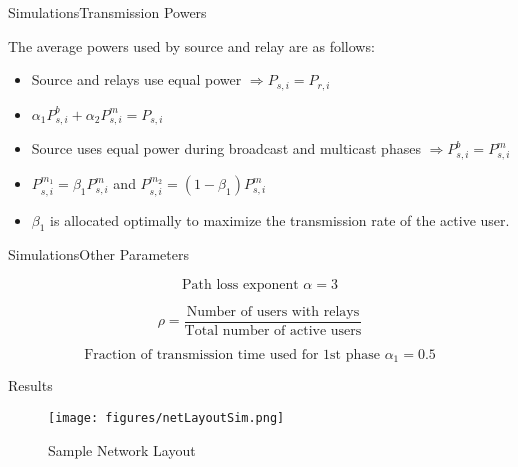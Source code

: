\documentclass{beamer}
\begin{document}
\begin{frame}{Simulations}{Transmission Powers}

The average powers used by source and relay are as follows:
\vspace{0.5cm}
\begin{itemize}
\item Source and relays use equal power $\Rightarrow P_{s,i} = P_{r,i}$
\vspace{0.5cm}
\item $\alpha_1 P_{s,i}^b + \alpha_2 P_{s,i}^m = P_{s,i}$
\vspace{0.5cm}
\item Source uses equal power during broadcast and multicast phases $\Rightarrow P_{s,i}^b = P_{s,i}^m $
\vspace{0.5cm}
\item $P_{s,i}^{m_1} = \beta_1 P_{s,i}^m$ and $P_{s,i}^{m_2} = (1-\beta_1) P_{s,i}^m$
\vspace{0.5cm}
\item  $\beta_1$ is allocated optimally to maximize the transmission rate of the active user. 
\end{itemize} 

\end{frame}

\begin{frame}{Simulations}{Other Parameters}
\centering

\begin{equation*}
\text{Path loss exponent } \alpha = 3
\end{equation*}

\begin{equation*}
\rho = \frac{\text{Number of users with relays}}{\text{Total number of active users}}
\end{equation*}

\begin{equation*}
\text{Fraction of transmission time used for 1st phase }\alpha_1 = 0.5
\end{equation*}


\end{frame}

\begin{frame}{Results}

\begin{figure}[!h]
\texttt{[image: figures/netLayoutSim.png]}
\centering
\vspace{-2mm}
\caption{Sample Network Layout}
\label{plot4}
\end{figure}
\end{frame}
\end{document}

